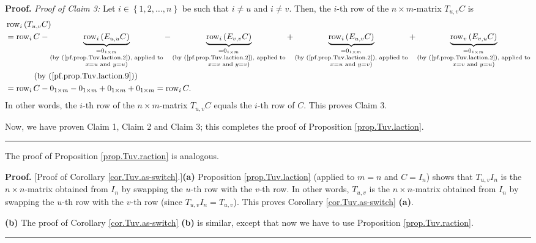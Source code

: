 \documentclass[numbers=enddot,12pt,final,onecolumn,notitlepage]{scrartcl}%
\theoremstyle{definition}
\newenvironment{proof}[1][Proof]{\noindent\textbf{#1.} }{\ \rule{0.5em}{0.5em}}
\begin{document}
\begin{proof}
\textit{Proof of Claim 3:} Let $i\in\left\{  1,2,\ldots,n\right\}  $ be such
that $i\neq u$ and $i\neq v$. Then, the $i$-th row of the $n\times m$-matrix
$T_{u,v}C$ is%
\begin{align*}
&  \operatorname*{row}\nolimits_{i}\left(  T_{u,v}C\right) \\
&  =\operatorname*{row}\nolimits_{i}C-\underbrace{\operatorname*{row}%
\nolimits_{i}\left(  E_{u,u}C\right)  }_{\substack{=0_{1\times m}\\\text{(by
(\ref{pf.prop.Tuv.laction.2}), applied to}\\x=u\text{ and }y=u\text{)}%
}}-\underbrace{\operatorname*{row}\nolimits_{i}\left(  E_{v,v}C\right)
}_{\substack{=0_{1\times m}\\\text{(by (\ref{pf.prop.Tuv.laction.2}), applied
to}\\x=v\text{ and }y=v\text{)}}}+\underbrace{\operatorname*{row}%
\nolimits_{i}\left(  E_{u,v}C\right)  }_{\substack{=0_{1\times m}\\\text{(by
(\ref{pf.prop.Tuv.laction.2}), applied to}\\x=u\text{ and }y=v\text{)}%
}}+\underbrace{\operatorname*{row}\nolimits_{v}\left(  E_{v,u}C\right)
}_{\substack{=0_{1\times m}\\\text{(by (\ref{pf.prop.Tuv.laction.2}), applied
to}\\x=v\text{ and }y=u\text{)}}}\\
&  \ \ \ \ \ \ \ \ \ \ \left(  \text{by (\ref{pf.prop.Tuv.laction.9})}\right)
\\
&  =\operatorname*{row}\nolimits_{i}C-0_{1\times m}-0_{1\times m}+0_{1\times
m}+0_{1\times m}=\operatorname*{row}\nolimits_{i}C.
\end{align*}
In other words, the $i$-th row of the $n\times m$-matrix $T_{u,v}C$ equals the
$i$-th row of $C$. This proves Claim 3.

Now, we have proven Claim 1, Claim 2 and Claim 3; this completes the proof of
Proposition \ref{prop.Tuv.laction}.
\end{proof}

The proof of Proposition \ref{prop.Tuv.raction} is analogous.

\begin{proof}
[Proof of Corollary \ref{cor.Tuv.as-switch}.]\textbf{(a)} Proposition
\ref{prop.Tuv.laction} (applied to $m=n$ and $C=I_{n}$) shows that
$T_{u,v}I_{n}$ is the $n\times n$-matrix obtained from $I_{n}$ by swapping the
$u$-th row with the $v$-th row. In other words, $T_{u,v}$ is the $n\times
n$-matrix obtained from $I_{n}$ by swapping the $u$-th row with the $v$-th row
(since $T_{u,v}I_{n}=T_{u,v}$). This proves Corollary \ref{cor.Tuv.as-switch}
\textbf{(a)}.

\textbf{(b)} The proof of Corollary \ref{cor.Tuv.as-switch} \textbf{(b)} is
similar, except that now we have to use Proposition \ref{prop.Tuv.raction}.
\end{proof}
\end{document}
